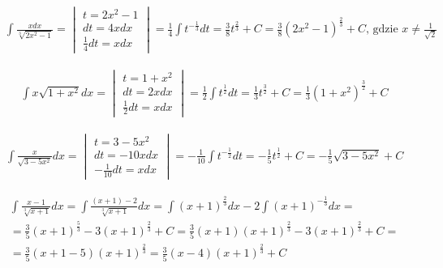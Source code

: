 
\begin{gather*}
  \int \frac{xdx}{\sqrt[3]{2x^2-1}} =
  \begin{vmatrix}
    t=2x^2-1 \\
    dt=4xdx \\
    \frac{1}{4}dt=xdx
  \end{vmatrix}
  = \frac{1}{4} \int t^{-\frac{1}{3}}dt
  = \frac{3}{8}t^{\frac{2}{3}}+C
  = \frac{3}{8}(2x^2-1)^{\frac{2}{3}}+C \text{, gdzie } x\neq \frac{1}{\sqrt{2}}
\end{gather*}


\begin{gather*}
  \int x\sqrt{1+x^2}dx =
  \begin{vmatrix}
    t=1+x^2 \\
    dt=2xdx \\
    \frac{1}{2}dt=xdx
  \end{vmatrix}
  = \frac{1}{2} \int t^{\frac{1}{2}}dt
  = \frac{1}{3}t^{\frac{3}{2}}+C
  = \frac{1}{3}(1+x^2)^{\frac{3}{2}}+C
\end{gather*}


\begin{gather*}
  \int \frac{x}{\sqrt{3-5x^2}}dx =
  \begin{vmatrix}
    t=3-5x^2 \\
    dt=-10xdx \\
    -\frac{1}{10}dt=xdx
  \end{vmatrix}
  = -\frac{1}{10} \int t^{-\frac{1}{2}}dt
  = -\frac{1}{5}t^{\frac{1}{2}}+C
  = -\frac{1}{5}\sqrt{3-5x^2}+C
\end{gather*}


\begin{gather*}
  \int \frac{x-1}{\sqrt[3]{x+1}}dx
  = \int \frac{(x+1)-2}{\sqrt[3]{x+1}}dx
  = \int (x+1)^{\frac{2}{3}}dx - 2 \int (x+1)^{-\frac{1}{3}}dx = \\
  = \frac{3}{5}(x+1)^{\frac{5}{3}}-3(x+1)^{\frac{2}{3}}+C
  = \frac{3}{5}(x+1)(x+1)^{\frac{2}{3}}-3(x+1)^{\frac{2}{3}} + C = \\
  = \frac{3}{5}(x+1-5)(x+1)^{\frac{2}{3}}
  = \frac{3}{5}(x-4)(x+1)^{\frac{2}{3}}+C
\end{gather*}



